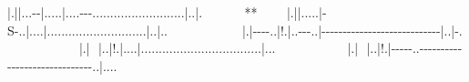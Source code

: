 \allowbreak{}|.\allowbreak{}|\allowbreak{}|...-{}-{}\allowbreak{}|.....\allowbreak{}|....-{}-{}-{}..........................\allowbreak{}|..\allowbreak{}|.{\mbox{$~$}}{\mbox{$~$}}{\mbox{$~$}}{\mbox{$~$}}{\mbox{$~$}}{\mbox{$~$}}{\mbox{$~$}}{\mbox{$~$}}{\mbox{$~$}}{\mbox{$~$}}{\mbox{$~$}}{\mbox{$~$}}{\mbox{$~$}}{\mbox{$~$}}{\mbox{$~$}}**{\mbox{$~$}}{\mbox{$~$}}{\mbox{$~$}}{\mbox{$~$}}{\mbox{$~$}}{\mbox{$~$}}$\text{ }$\newline{}
\allowbreak{}|.\allowbreak{}|\allowbreak{}|.....\allowbreak{}|-{}S\footnotemark[96]-{}..\allowbreak{}|....\allowbreak{}|............................\allowbreak{}|..\allowbreak{}|..{\mbox{$~$}}{\mbox{$~$}}{\mbox{$~$}}{\mbox{$~$}}{\mbox{$~$}}{\mbox{$~$}}{\mbox{$~$}}{\mbox{$~$}}{\mbox{$~$}}{\mbox{$~$}}{\mbox{$~$}}{\mbox{$~$}}{\mbox{$~$}}{\mbox{$~$}}{\mbox{$~$}}{\mbox{$~$}}{\mbox{$~$}}{\mbox{$~$}}{\mbox{$~$}}{\mbox{$~$}}{\mbox{$~$}}{\mbox{$~$}}$\text{ }$\newline{}
\allowbreak{}|.\allowbreak{}|-{}-{}-{}-{}..\allowbreak{}|!.\allowbreak{}|..-{}-{}-{}..\allowbreak{}|-{}-{}-{}-{}-{}-{}-{}-{}-{}-{}-{}-{}-{}-{}-{}-{}-{}-{}-{}-{}-{}-{}-{}-{}-{}-{}-{}-{}\allowbreak{}|..\allowbreak{}|-{}.{\mbox{$~$}}{\mbox{$~$}}{\mbox{$~$}}{\mbox{$~$}}{\mbox{$~$}}{\mbox{$~$}}{\mbox{$~$}}{\mbox{$~$}}{\mbox{$~$}}{\mbox{$~$}}{\mbox{$~$}}{\mbox{$~$}}{\mbox{$~$}}{\mbox{$~$}}{\mbox{$~$}}{\mbox{$~$}}{\mbox{$~$}}{\mbox{$~$}}{\mbox{$~$}}{\mbox{$~$}}{\mbox{$~$}}{\mbox{$~$}}$\text{ }$\newline{}
\allowbreak{}|.\allowbreak{}|{\mbox{$~$}}{\mbox{$~$}}{\mbox{$~$}}\allowbreak{}|..\allowbreak{}|!.\allowbreak{}|....\allowbreak{}|..................................\allowbreak{}|...{\mbox{$~$}}{\mbox{$~$}}{\mbox{$~$}}{\mbox{$~$}}{\mbox{$~$}}{\mbox{$~$}}{\mbox{$~$}}{\mbox{$~$}}{\mbox{$~$}}{\mbox{$~$}}{\mbox{$~$}}{\mbox{$~$}}{\mbox{$~$}}{\mbox{$~$}}{\mbox{$~$}}{\mbox{$~$}}{\mbox{$~$}}{\mbox{$~$}}{\mbox{$~$}}{\mbox{$~$}}{\mbox{$~$}}$\text{ }$\newline{}
\allowbreak{}|.\allowbreak{}|{\mbox{$~$}}{\mbox{$~$}}{\mbox{$~$}}\allowbreak{}|..\allowbreak{}|!.\allowbreak{}|-{}-{}-{}-{}-{}..-{}-{}-{}-{}-{}-{}-{}-{}-{}-{}-{}-{}-{}-{}-{}-{}-{}-{}-{}-{}-{}-{}-{}-{}-{}-{}-{}-{}-{}-{}..\allowbreak{}|....{\mbox{$~$}}{\mbox{$~$}}{\mbox{$~$}}{\mbox{$~$}}{\mbox{$~$}}{\mbox{$~$}}{\mbox{$~$}}{\mbox{$~$}}{\mbox{$~$}}{\mbox{$~$}}{\mbox{$~$}}{\mbox{$~$}}{\mbox{$~$}}{\mbox{$~$}}{\mbox{$~$}}{\mbox{$~$}}{\mbox{$~$}}{\mbox{$~$}}{\mbox{$~$}}{\mbox{$~$}}$\text{ }$\newline{}
